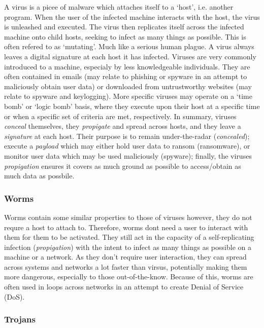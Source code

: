 \documentclass[11pt, english]{article}
\begin{document}
	A virus is a picee of malware which attaches itself to a `host', i.e. another program. When the user of the infected machine interacts with the host, the virus is unleashed and executed. The virus then replicates itself across the infected machine onto child hosts, seeking to infect as many things as possible. This is often refered to as `mutating'. Much like a serious human plague. A virus always leaves a digital signature at each host it has infected. Viruses are very commonly introduced to a machine, especialy by less knowledgeable individuals. They are often contained in emails (may relate to phishing or spyware in an attempt to maliciously obtain user data) or downloaded from untrustworthy websites (may relate to spyware and keylogging). More specific viruses may operate on a `time bomb' or `logic bomb' basis, where they execute upon their host at a specific time or when a specific set of criteria are met, respectively. In summary, viruses \textit{conceal} themselves, they \textit{propigate} and spread across hosts, and they leave a \textit{signature} at each host. Their purpose is to remain under-the-radar (\textit{concealed}); execute a \textit{payload} which may either hold user data to ransom (ransomware), or monitor user data which may be used maliciously (spyware); finally, the viruses \textit{propigation} ensures it covers as much ground as possible to access/obtain as much data as possbile.

		\subsubsection{Worms}

	Worms contain some similar properties to those of viruses however, they do not requre a host to attach to. Therefore, worms dont need a user to interact with them for them to be activated. They still act in the capacity of a self-replicating infection (\textit{propigation}) with the intent to infect as many things as possible on a machine or a network. As they don't require user interaction, they can spread across systems and networks a lot faster than virsus, potentially making them more dangerous, especially to those out-of-the-know. Because of this, worms are often used in loops across networks in an attempt to create Denial of Service (DoS).

		\subsubsection{Trojans}
\end{document}
